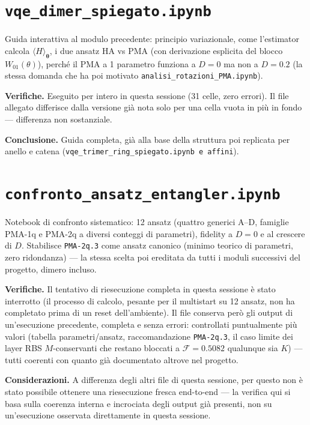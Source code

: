 \documentclass[11pt,a4paper]{article}
\begin{document}
\section*{\texttt{vqe\_dimer\_spiegato.ipynb}}

Guida interattiva al modulo precedente: principio variazionale, come l'estimator
calcola $\langle H\rangle_{\boldsymbol\theta}$, i due ansatz HA vs PMA (con
derivazione esplicita del blocco $W_{01}(\theta)$), perché il PMA a 1 parametro
funziona a $D=0$ ma non a $D=0.2$ (la stessa domanda che ha poi motivato
\texttt{analisi\_rotazioni\_PMA.ipynb}).

\textbf{Verifiche.} Eseguito per intero in questa sessione (31 celle, zero errori).
Il file allegato differisce dalla versione già nota solo per una cella vuota in più
in fondo — differenza non sostanziale.

\textbf{Conclusione.} Guida completa, già alla base della struttura poi replicata
per anello e catena (\texttt{vqe\_trimer\_ring\_spiegato.ipynb\ e affini}).

\section*{\texttt{confronto\_ansatz\_entangler.ipynb}}

Notebook di confronto sistematico: 12 ansatz (quattro generici A–D, famiglie
PMA-1q e PMA-2q a diversi conteggi di parametri), fidelity a $D=0$ e al crescere di
$D$. Stabilisce \texttt{PMA-2q.3} come ansatz canonico (minimo teorico di
parametri, zero ridondanza) — la stessa scelta poi ereditata da tutti i moduli
successivi del progetto, dimero incluso.

\textbf{Verifiche.} Il tentativo di riesecuzione completa in questa sessione è
stato interrotto (il processo di calcolo, pesante per il multistart su 12 ansatz,
non ha completato prima di un reset dell'ambiente). Il file conserva però gli
output di un'esecuzione precedente, completa e senza errori: controllati
puntualmente più valori (tabella parametri/ansatz, raccomandazione
\texttt{PMA-2q.3}, il caso limite dei layer RBS $M$-conservanti che restano bloccati
a $\mathcal F=0.5082$ qualunque sia $K$) — tutti coerenti con quanto già
documentato altrove nel progetto.

\textbf{Considerazioni.} A differenza degli altri file di questa sessione, per
questo non è stato possibile ottenere una riesecuzione fresca end-to-end — la
verifica qui si basa sulla coerenza interna e incrociata degli output già presenti,
non su un'esecuzione osservata direttamente in questa sessione.
\end{document}

